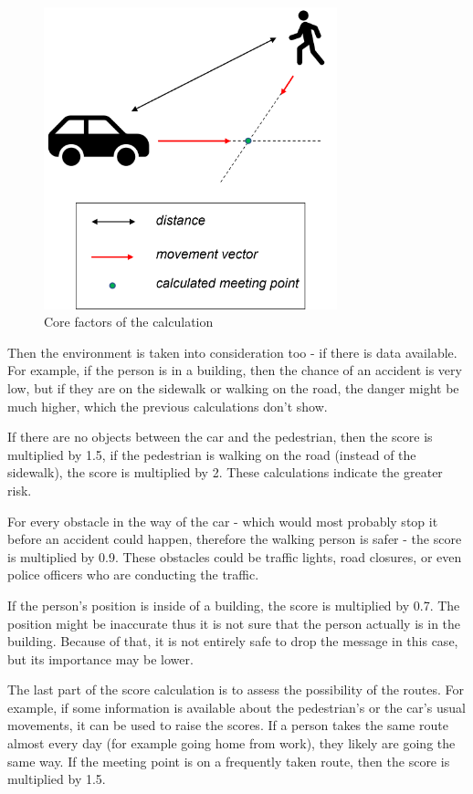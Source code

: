 \documentclass[conference]{IEEEtran}
\begin{document}
\begin{figure}[ht]
    \centering
    \includegraphics[width=8.5cm]{./pics/Core factors of the calculation.png}
    \caption{Core factors of the calculation}
\end{figure}

Then the environment is taken into consideration too - if there is data available. For example, if the person is in a building, then the chance of an accident is very low, but if they are on the sidewalk or walking on the road, the danger might be much higher, which the previous calculations don't show.

If there are no objects between the car and the pedestrian, then the score is multiplied by 1.5, if the pedestrian is walking on the road (instead of the sidewalk), the score is multiplied by 2. These calculations indicate the greater risk.

For every obstacle in the way of the car - which would most probably stop it before an accident could happen, therefore the walking person is safer - the score is multiplied by 0.9. These obstacles could be traffic lights, road closures, or even police officers who are conducting the traffic.

If the person’s position is inside of a building, the score is multiplied by 0.7. The position might be inaccurate thus it is not sure that the person actually is in the building. Because of that, it is not entirely safe to drop the message in this case, but its importance may be lower.

The last part of the score calculation is to assess the possibility of the routes. For example, if some information is available about the pedestrian's or the car's usual movements, it can be used to raise the scores. If a person takes the same route almost every day (for example going home from work), they likely are going the same way. If the meeting point is on a frequently taken route, then the score is multiplied by 1.5.
\end{document}
